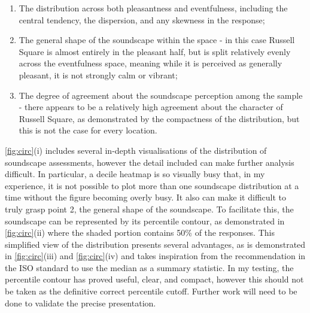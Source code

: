 \begin{enumerate}
  \item The distribution across both pleasantness and eventfulness, including the central tendency, the dispersion, and any skewness in the response;
  \item The general shape of the soundscape within the space - in this case Russell Square is almost entirely in the pleasant half, but is split relatively evenly across the eventfulness space, meaning while it is perceived as generally pleasant, it is not strongly calm or vibrant;
  \item The degree of agreement about the soundscape perception among the sample - there appears to be a relatively high agreement about the character of Russell Square, as demonstrated by the compactness of the distribution, but this is not the case for every location.
\end{enumerate}

\cref{fig:circ}(i) includes several in-depth visualisations of the distribution of soundscape assessments, however the detail included can make further analysis difficult. In particular, a decile heatmap is so visually busy that, in my experience, it is not possible to plot more than one soundscape distribution at a time without the figure becoming overly busy. It also can make it difficult to truly grasp point 2, the general shape of the soundscape. To facilitate this, the soundscape can be represented by its  percentile contour, as demonstrated in \cref{fig:circ}(ii) where the shaded portion contains 50\% of the responses. This simplified view of the distribution presents several advantages, as is demonstrated in \cref{fig:circ}(iii) and \cref{fig:circ}(iv) and takes inspiration from the recommendation in the ISO standard to use the median as a summary statistic. In my testing, the  percentile contour has proved useful, clear, and compact, however this should not be taken as the definitive correct percentile cutoff. Further work will need to be done to validate the precise presentation.

